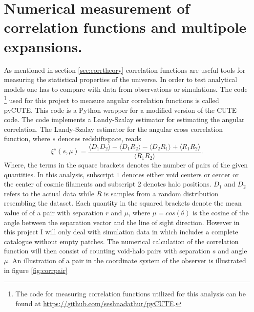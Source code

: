 \section{Numerical measurement of correlation functions and multipole expansions.}\label{sec:numerical_corr}
As mentioned in section \ref{sec:corrtheory} correlation functions are useful
tools for measuring the statistical properties of the universe. In order to test
analytical models one has to compare with data from observations or simulations.
The code \footnote{The code for measuring correlation functions utilized for this analysis can be found at \url{https://github.com/seshnadathur/pyCUTE}.} used for this project to measure angular correlation functions
is called pyCUTE. This code is a Python wrapper for a modified version of the CUTE\cite{alonso2013cute} code. The code implements a Landy-Szalay estimator \cite{Landy} for estimating the angular correlation. The Landy-Szalay estimator
for the angular cross correlation function, where $s$ denotes redshiftspace, reads
\begin{equation}
    \xi^s(s,\mu)=\frac{\langle D_1D_2\rangle-\langle D_1R_2\rangle-\langle D_2R_1\rangle+\langle R_1R_2\rangle}{\langle R_1R_2\rangle}.
\end{equation}
Where, the terms in the square brackets denotes the number of pairs of the given quantities. In this analysis, subscript $1$ denotes either void centers or center or
the center of cosmic filaments and subscript $2$ denotes halo positions. $D_1$
and $D_2$ refers to the actual data while $R$ is samples from a random
distribution resembling the dataset. Each quantity in the squared brackets
denote the mean value of of a pair with separation $r$ and $\mu$, where
$\mu=cos(\theta)$ is the cosine of the angle between the separation vector and
the line of sight direction. However in this project I will only deal with simulation data in which includes a complete catalogue without empty patches.
The numerical calculation of the correlation function will then consist of counting void-halo pairs with separation $s$ and angle $\mu$.
An illustration of a pair in the coordinate system
of the observer is illustrated in figure \ref{fig:corrpair}

